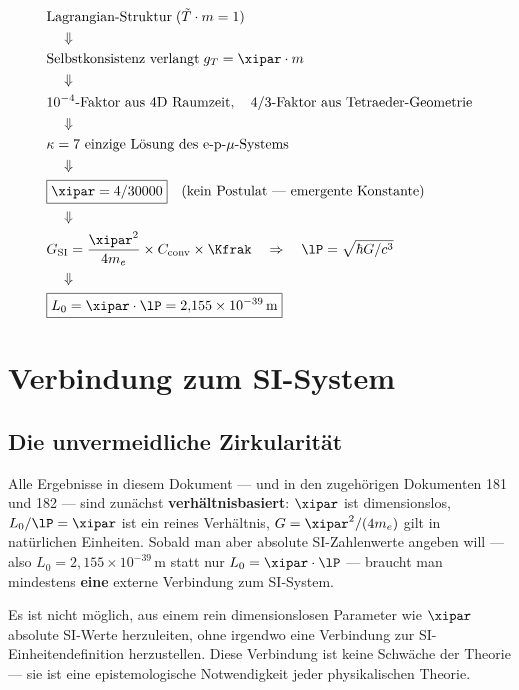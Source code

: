 \begin{keyresult}
\begin{align}
	&\text{Lagrangian-Struktur} \; (\tilde{T} \cdot m = 1) \notag \\
	&\quad\Downarrow \notag \\
	&\text{Selbstkonsistenz verlangt} \; g_T = \xipar \cdot m \notag \\
	&\quad\Downarrow \notag \\
	&10^{-4}\text{-Faktor aus 4D Raumzeit},\quad 4/3\text{-Faktor aus Tetraeder-Geometrie} \notag \\
	&\quad\Downarrow \notag \\
	&\kappa = 7 \text{ einzige Lösung des e-p-}\mu\text{-Systems} \notag \\
	&\quad\Downarrow \notag \\
	&\boxed{\xipar = 4/30000} \quad \text{(kein Postulat — emergente Konstante)} \notag \\
	&\quad\Downarrow \notag \\
	&G_{\text{SI}} = \frac{\xipar^2}{4m_e} \times C_{\text{conv}} \times \Kfrak \quad\Rightarrow\quad \lP = \sqrt{\hbar G/c^3} \notag \\
	&\quad\Downarrow \notag \\
	&\boxed{L_0 = \xipar \cdot \lP = 2{,}155 \times 10^{-39}\,\text{m}}
\end{align}
\end{keyresult}

\section{Verbindung zum SI-System}

\subsection{Die unvermeidliche Zirkularität}

Alle Ergebnisse in diesem Dokument — und in den zugehörigen Dokumenten 181 und 182 — sind zunächst \textbf{verhältnisbasiert}: $\xipar$ ist dimensionslos, $L_0/\lP = \xipar$ ist ein reines Verhältnis, $G = \xipar^2/(4m_e)$ gilt in natürlichen Einheiten. Sobald man aber absolute SI-Zahlenwerte angeben will — also $L_0 = 2{,}155 \times 10^{-39}\,\text{m}$ statt nur $L_0 = \xipar \cdot \lP$ — braucht man mindestens \textbf{eine} externe Verbindung zum SI-System.

\begin{important}
Es ist nicht möglich, aus einem rein dimensionslosen Parameter wie $\xipar$ absolute SI-Werte herzuleiten, ohne irgendwo eine Verbindung zur SI-Einheitendefinition herzustellen. Diese Verbindung ist keine Schwäche der Theorie — sie ist eine epistemologische Notwendigkeit jeder physikalischen Theorie.
\end{important}


